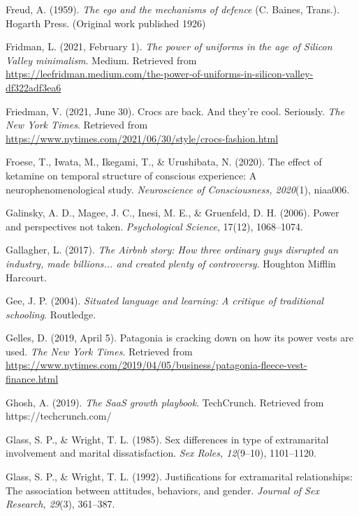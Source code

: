\begin{thebibliography}{}
    Freud, A. (1959). \textit{The ego and the mechanisms of defence} (C. Baines, Trans.). Hogarth Press. (Original work published 1926)

    Fridman, L. (2021, February 1). \textit{The power of uniforms in the age of Silicon Valley minimalism}. Medium. Retrieved from \url{https://leefridman.medium.com/the-power-of-uniforms-in-silicon-valley-df322adf3ea6}

    Friedman, V. (2021, June 30). Crocs are back. And they’re cool. Seriously. \textit{The New York Times}. Retrieved from \url{https://www.nytimes.com/2021/06/30/style/crocs-fashion.html}


    Froese, T., Iwata, M., Ikegami, T., \& Urushibata, N. (2020). The effect of ketamine on temporal structure of conscious experience: A neurophenomenological study. \textit{Neuroscience of Consciousness, 2020}(1), niaa006.

    
    Galinsky, A. D., Magee, J. C., Inesi, M. E., \& Gruenfeld, D. H. (2006). Power and perspectives not taken. \textit{Psychological Science}, 17(12), 1068–1074.

    Gallagher, L. (2017). \textit{The Airbnb story: How three ordinary guys disrupted an industry, made billions... and created plenty of controversy}. Houghton Mifflin Harcourt.
    
    Gee, J. P. (2004). \textit{Situated language and learning: A critique of traditional schooling}. Routledge.

    Gelles, D. (2019, April 5). Patagonia is cracking down on how its power vests are used. \textit{The New York Times}. Retrieved from \url{https://www.nytimes.com/2019/04/05/business/patagonia-fleece-vest-finance.html}

    Ghosh, A. (2019). \textit{The SaaS growth playbook}. TechCrunch. Retrieved from https://techcrunch.com/
    
    Glass, S. P., \& Wright, T. L. (1985). Sex differences in type of extramarital involvement and marital dissatisfaction. \textit{Sex Roles, 12}(9–10), 1101–1120.
    
    Glass, S. P., \& Wright, T. L. (1992). Justifications for extramarital relationships: The association between attitudes, behaviors, and gender. \textit{Journal of Sex Research, 29}(3), 361–387.
    

\end{thebibliography}
